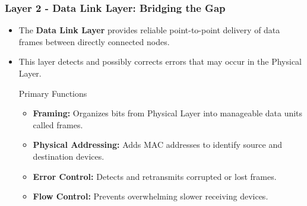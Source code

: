 \documentclass{beamer}
\begin{document}
\begin{frame}
    \frametitle{Layer 2 - Data Link Layer: Bridging the Gap}
    
    \begin{itemize}
        \item The \textbf{Data Link Layer} provides reliable point-to-point delivery of data frames between directly connected nodes.
        
        \item This layer detects and possibly corrects errors that may occur in the Physical Layer.
        
        \begin{block}{Primary Functions}
            \begin{itemize}
                \item \textbf{Framing:} Organizes bits from Physical Layer into manageable data units called frames.
                
                \item \textbf{Physical Addressing:} Adds MAC addresses to identify source and destination devices.
                
                \item \textbf{Error Control:} Detects and retransmits corrupted or lost frames.
                
                \item \textbf{Flow Control:} Prevents overwhelming slower receiving devices.
            \end{itemize}
        \end{block}
    \end{itemize}
\end{frame}
\end{document}
